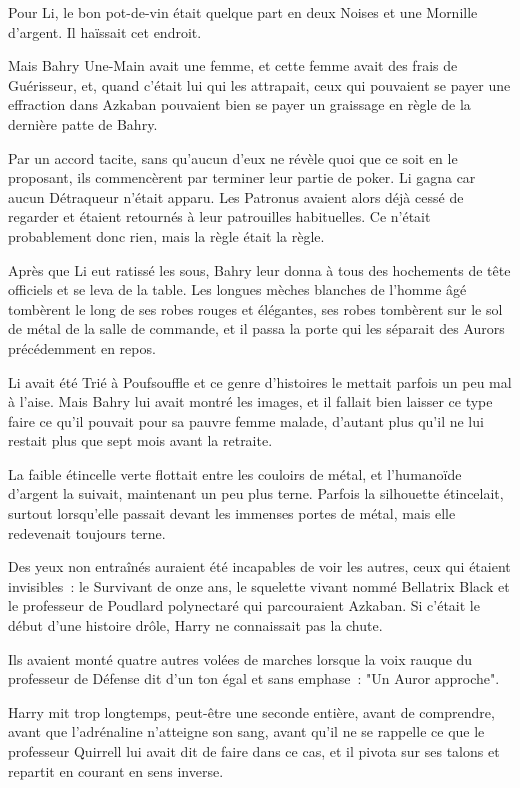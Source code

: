 Pour Li, le bon pot-de-vin était quelque part en deux Noises et une Mornille d'argent. Il haïssait cet endroit.

Mais Bahry Une-Main avait une femme, et cette femme avait des frais de Guérisseur, et, quand c'était lui qui les attrapait, ceux qui pouvaient se payer une effraction dans Azkaban pouvaient bien se payer un graissage en règle de la dernière patte de Bahry.

Par un accord tacite, sans qu'aucun d'eux ne révèle quoi que ce soit en le proposant, ils commencèrent par terminer leur partie de poker. Li gagna car aucun Détraqueur n'était apparu. Les Patronus avaient alors déjà cessé de regarder et étaient retournés à leur patrouilles habituelles. Ce n'était probablement donc rien, mais la règle était la règle.

Après que Li eut ratissé les sous, Bahry leur donna à tous des hochements de tête officiels et se leva de la table. Les longues mèches blanches de l'homme âgé tombèrent le long de ses robes rouges et élégantes, ses robes tombèrent sur le sol de métal de la salle de commande, et il passa la porte qui les séparait des Aurors précédemment en repos.

Li avait été Trié à Poufsouffle et ce genre d'histoires le mettait parfois un peu mal à l'aise. Mais Bahry lui avait montré les images, et il fallait bien laisser ce type faire ce qu'il pouvait pour sa pauvre femme malade, d'autant plus qu'il ne lui restait plus que sept mois avant la retraite.

\later

La faible étincelle verte flottait entre les couloirs de métal, et l'humanoïde d'argent la suivait, maintenant un peu plus terne. Parfois la silhouette étincelait, surtout lorsqu'elle passait devant les immenses portes de métal, mais elle redevenait toujours terne.

Des yeux non entraînés auraient été incapables de voir les autres, ceux qui étaient invisibles~: le Survivant de onze ans, le squelette vivant nommé Bellatrix Black et le professeur de Poudlard polynectaré qui parcouraient Azkaban. Si c'était le début d'une histoire drôle, Harry ne connaissait pas la chute.

Ils avaient monté quatre autres volées de marches lorsque la voix rauque du professeur de Défense dit d'un ton égal et sans emphase~: "Un Auror approche".

Harry mit trop longtemps, peut-être une seconde entière, avant de comprendre, avant que l'adrénaline n'atteigne son sang, avant qu'il ne se rappelle ce que le professeur Quirrell lui avait dit de faire dans ce cas, et il pivota sur ses talons et repartit en courant en sens inverse.

